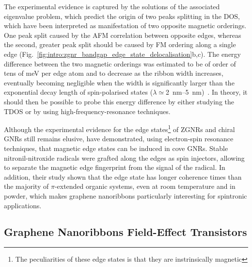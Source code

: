 %
The experimental evidence is captured by the solutions of the associated eigenvalue problem, which predict the origin of two peaks splitting in the \gls{DOS}, which have been interpreted as manifestation of two opposite magnetic orderings. One peak split caused by the AFM correlation between opposite edges, whereas the second, greater peak split should be caused by FM ordering along a single edge (Fig.~\ref{fig:intro:zgnr_bandgap_edge_state_delocalisation}b,c). The energy difference between the two magnetic orderings was estimated to be of order of tens of \si{\milli\electronvolt} per edge atom and to decrease as the ribbon width increases, eventually becoming negligible when the width is significantly larger than the exponential decay length of spin-polarised states ($\lambda\simeq$\SIrange{2}{5}{\nano\meter})~\cite{lee2005magnetic}. In theory, it should then be possible to probe this energy difference by either studying the \gls{TDOS} or by using high-frequency-resonance techniques.

Although the experimental evidence for the edge states\footnote[2]{The peculiarities of these edge states is that they are instrinsically magnetic} of \glspl{ZGNR} and chiral \glspl{GNR} still remains elusive, \citeauthor{slota2018magnetic} have demonstrated, using electron-spin resonance techniques, that magnetic edge states can be induced in cove \glspl{GNR}. Stable nitronil-nitroxide radicals were grafted along the edges as spin injectors, allowing to separate the magnetic edge fingerprint from the signal of the radical. In addition, their study shown that the edge state has longer coherence times than the majority of $\pi$-extended organic systems, even at room temperature and in powder, which makes graphene nanoribbons particularly interesting for spintronic applications.

\subsection{Graphene Nanoribbons Field-Effect Transistors}

